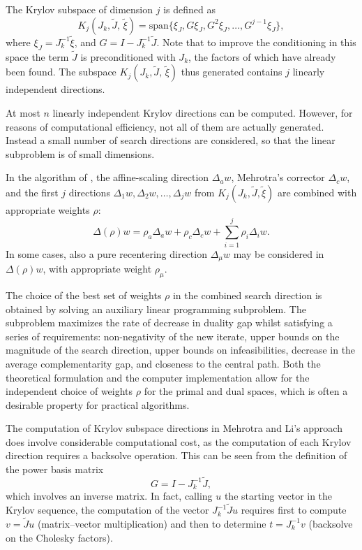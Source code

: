 The Krylov subspace of dimension $j$ is defined as
\[
K_j (J_k, \tilde J, \, \tilde \xi) =
{\mbox{span}} \{ \xi_J, G \xi_J, G^2 \xi_J, \dots,  G^{j-1} \xi_J \}, 
\]
where $\xi_J = J_k^{-1} \tilde \xi$, and $G = I - J_k^{-1} \tilde J$. 
Note that to improve the conditioning in this space
the term $\tilde J$ is preconditioned with $J_k$, 
the factors of which have already been found.
The subspace $K_j (J_k, \tilde J, \, \tilde \xi)$
thus generated contains $j$ linearly independent directions. 

At most $n$ linearly independent Krylov directions can be
computed. However, for reasons of computational efficiency, 
not all of them are actually generated. Instead a small number
of search directions are considered, so that the linear subproblem 
is of small dimensions.

In the algorithm of \cite{MehrotraLi}, the affine-scaling
direction $\Delta_a w$, Mehrotra's corrector $\Delta_c w$, and
the first $j$ directions $\Delta_1 w, \Delta_2 w, \dots, \Delta_j w$ 
from $K_j (J_k, \tilde J, \tilde \xi)$ are 
combined with appropriate weights $\rho$:
\[
\Delta(\rho) w = \rho_a\Delta_a w + \rho_c\Delta_c w
               + \sum_{i=1}^j \rho_i \Delta_i w.
\]
In some cases, also a pure recentering direction $\Delta_\mu w$ may
be considered in $\Delta(\rho) w$, with appropriate weight $\rho_\mu$.

The choice of the best set of weights $\rho$ in the combined search 
direction is obtained by solving an auxiliary linear programming 
subproblem. The subproblem maximizes the rate of decrease 
in duality gap whilst satisfying a series of requirements:
non-negativity of the new iterate,
upper bounds on the magnitude of the search direction,
upper bounds on infeasibilities,
decrease in the average complementarity gap,
and closeness to the central path.
Both the theoretical formulation and the computer implementation 
allow for the independent choice of weights $\rho$ for the primal 
and dual spaces, which is often a desirable property for
practical algorithms.

The computation of Krylov subspace directions in Mehrotra and Li's 
approach does involve considerable computational cost, as
the computation of each Krylov direction requires a backsolve operation. 
This can be seen from the definition of the power basis matrix
\[
  G = I - J_k^{-1}\tilde J,
\]
which involves an inverse matrix. In fact, calling $u$ the starting vector 
in the Krylov sequence, the computation of the vector $ J_k^{-1}\tilde Ju$ 
requires first to compute $v = \tilde Ju$ (matrix--vector multiplication) 
and then to determine $t=J_k^{-1}v$ (backsolve on the Cholesky factors).

